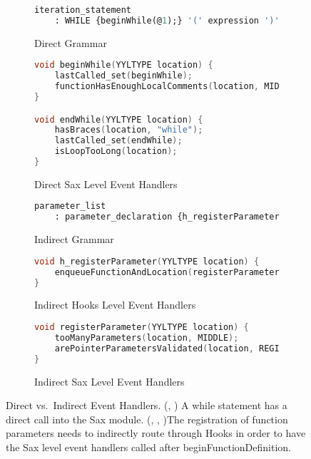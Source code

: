 \documentclass[12pt]{report}
\begin{document}
\begin{figure}

\begin{subfigure}[t]{\linewidth}
\caption{Direct Grammar}
\label{directGrammar}
\begin{lstlisting}[language=Caml]
iteration_statement
	: WHILE {beginWhile(@1);} '(' expression ')' statement   {endWhile(@$);}
\end{lstlisting}
\end{subfigure}

\begin{subfigure}[b]{\linewidth}
\caption{Direct Sax Level Event Handlers}
\label{directSax}
\begin{lstlisting}[language=C]
void beginWhile(YYLTYPE location) {
	lastCalled_set(beginWhile);
	functionHasEnoughLocalComments(location, MIDDLE, 0);
}

void endWhile(YYLTYPE location) {
	hasBraces(location, "while");
	lastCalled_set(endWhile);
	isLoopTooLong(location);
}
\end{lstlisting}
\end{subfigure}

\begin{subfigure}[t]{\linewidth}
\caption{Indirect Grammar}
\label{indirectGrammar}
\begin{lstlisting}[language=Caml]
parameter_list
	: parameter_declaration	{h_registerParameter(@$);}
\end{lstlisting}
\end{subfigure}

\begin{subfigure}[b]{\linewidth}
\caption{Indirect Hooks Level Event Handlers}
\label{indirectHooks}
\begin{lstlisting}[language=C]
void h_registerParameter(YYLTYPE location) {
	enqueueFunctionAndLocation(registerParameter, location);
}
\end{lstlisting}
\end{subfigure}

\begin{subfigure}[b]{\linewidth}
\caption{Indirect Sax Level Event Handlers}
\label{indirectSax}
\begin{lstlisting}[language=C]
void registerParameter(YYLTYPE location) {
	tooManyParameters(location, MIDDLE);
	arePointerParametersValidated(location, REGISTER_PARAM, NULL);
}
\end{lstlisting}
\end{subfigure}

\caption[Direct vs.\ Indirect Event Handlers]{Direct vs.\ Indirect Event Handlers. (, ) A while statement has a direct call into the Sax module. (, , )The registration of function parameters needs to indirectly route through Hooks in order to have the Sax level event handlers called after beginFunctionDefinition.}
\label{saxAndHooksHandlers}
\end{figure}
\end{document}
